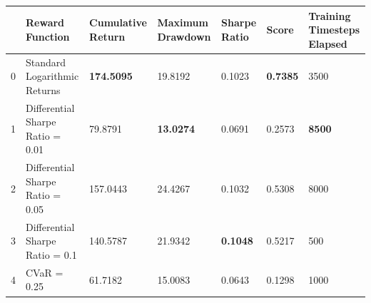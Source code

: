 \begin{tabular}{lllllll}
\toprule
 & Reward Function & Cumulative Return & Maximum Drawdown & Sharpe Ratio & Score & Training Timesteps Elapsed \\
\midrule
0 & Standard Logarithmic Returns & \textbf{174.5095} & 19.8192 & 0.1023 & \textbf{0.7385} & 3500 \\
1 & Differential Sharpe Ratio = 0.01 & 79.8791 & \textbf{13.0274} & 0.0691 & 0.2573 & \textbf{8500} \\
2 & Differential Sharpe Ratio = 0.05 & 157.0443 & 24.4267 & 0.1032 & 0.5308 & 8000 \\
3 & Differential Sharpe Ratio = 0.1 & 140.5787 & 21.9342 & \textbf{0.1048} & 0.5217 & 500 \\
4 & CVaR = 0.25 & 61.7182 & 15.0083 & 0.0643 & 0.1298 & 1000 \\
\bottomrule
\end{tabular}
